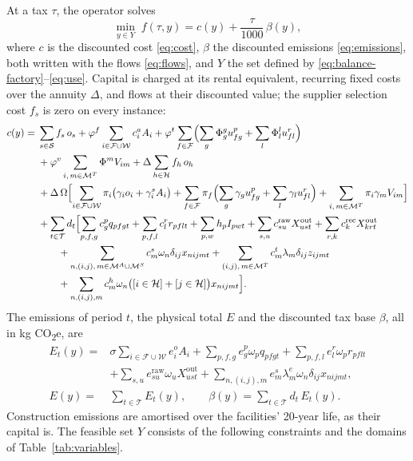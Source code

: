 \documentclass[review,11pt,nonatbib]{elsarticle}
\theoremstyle{remark}
\newcommand{\Xout}{X^{\mathrm{out}}}
\newcommand{\CO}{CO\textsubscript{2}e}
\begin{document}
At a tax $\tau$, the operator solves
\begin{equation}\label{eq:follower}
\min_{y \in Y} \; f(\tau, y) = c(y) + \frac{\tau}{1000}\,\beta(y),
\end{equation}
where $c$ is the discounted cost \eqref{eq:cost}, $\beta$ the discounted emissions \eqref{eq:emissions}, both written with the flows \eqref{eq:flows}, and $Y$ the set defined by \eqref{eq:balance-factory}--\eqref{eq:use}. Capital is charged at its rental equivalent, recurring fixed costs over the annuity $\Delta$, and flows at their discounted value; the supplier selection cost $f_s$ is zero on every instance:
\begin{equation}\label{eq:cost}
\begin{aligned}
c(y) ={}& \sum_{s \in \mathcal{S}} f_s\, o_s + \varphi^{f} \sum_{i \in \mathcal{F} \cup \mathcal{W}} c^{a}_i A_i + \varphi^{t} \sum_{f \in \mathcal{F}} \Bigl( \sum_{g} \Phi^{g}_g u^{p}_{fg} + \sum_{l} \Phi^{l}_l u^{r}_{fl} \Bigr) \\
&+ \varphi^{v} \sum_{i,\, m \in \mathcal{M}^T} \Phi^{m} V_{im} + \Delta \sum_{h \in \mathcal{H}} f_h\, o_h \\
&+ \Delta\, \Omega \Bigl[ \sum_{i \in \mathcal{F} \cup \mathcal{W}} \pi_i \bigl( \gamma_i o_i + \gamma^{s}_i A_i \bigr) + \sum_{f \in \mathcal{F}} \pi_f \Bigl( \sum_g \gamma_g u^{p}_{fg} + \sum_l \gamma_l u^{r}_{fl} \Bigr) + \sum_{i,\, m \in \mathcal{M}^T} \pi_i \gamma_m V_{im} \Bigr] \\
&+ \sum_{t \in \mathcal{T}} d_t \Bigl[ \sum_{p,f,g} c^{p}_g q_{pfgt} + \sum_{p,f,l} c^{r}_l r_{pflt} + \sum_{p,w} h_p I_{pwt} + \sum_{s,u} c^{\mathrm{raw}}_{su} \Xout_{ust} + \sum_{r,k} c^{\mathrm{rec}}_{k} \Xout_{krt} \\
&\qquad + \sum_{n,(i,j),\, m \in \mathcal{M}^A \cup \mathcal{M}^S} c^{s}_m \omega_n \delta_{ij} x_{nijmt} + \sum_{(i,j),\, m \in \mathcal{M}^T} c^{t}_m \lambda_m \delta_{ij} z_{ijmt} \\
&\qquad + \sum_{n,(i,j),m} c^{h}_m \omega_n \bigl( [i \in \mathcal{H}] + [j \in \mathcal{H}] \bigr) x_{nijmt} \Bigr].
\end{aligned}
\end{equation}
The emissions of period $t$, the physical total $E$ and the discounted tax base $\beta$, all in kg \CO, are
\begin{equation}\label{eq:emissions}
\begin{aligned}
E_t(y) ={}& \sigma \sum_{i \in \mathcal{F} \cup \mathcal{W}} e^{o}_i A_i + \sum_{p,f,g} e^{p}_g \omega_p q_{pfgt} + \sum_{p,f,l} e^{r}_l \omega_p r_{pflt} \\
&+ \sum_{s,u} e^{\mathrm{raw}}_{su} \omega_u \Xout_{ust} + \sum_{n,(i,j),m} e^{s}_m \lambda^{e}_m \omega_n \delta_{ij} x_{nijmt}, \\
E(y) ={}& \sum_{t \in \mathcal{T}} E_t(y), \qquad \beta(y) = \sum_{t \in \mathcal{T}} d_t\, E_t(y).
\end{aligned}
\end{equation}
Construction emissions are amortised over the facilities' 20-year life, as their capital is. The feasible set $Y$ consists of the following constraints and the domains of Table~\ref{tab:variables}.
\end{document}
